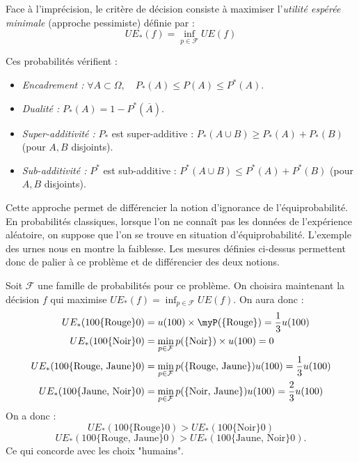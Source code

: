 Face à l'imprécision, le critère de décision consiste à maximiser l'\emph{utilité espérée minimale} (approche pessimiste) 
définie par : 
\begin{equation}
    UE_*(f) = \inf_{p \in \mathcal{F}} UE(f)
\end{equation}

\begin{prop}
    Ces probabilités vérifient :
    \begin{itemize}
        \item \emph{Encadrement :} $\forall A \subset \Omega, \quad P_*(A) \leqslant P(A) \leqslant P^*(A)$.
        \item \emph{Dualité :} $P_*(A) = 1 - P^*(\overline{A})$.
        \item \emph{Super-additivité :} $P_*$ est super-additive : $P_*(A \cup B) \geqslant P_*(A) + P_*(B)$ (pour $A, B$ disjoints).
        \item \emph{Sub-additivité :} $P^*$ est sub-additive : $P^*(A \cup B) \leqslant P^*(A) + P^*(B)$ (pour $A, B$ disjoints).
    \end{itemize}
\end{prop}

\begin{remark}
    Cette approche permet de différencier la notion d'ignorance de l'équiprobabilité. 
    En probabilités classiques, lorsque l'on ne connaît pas les données de l'expérience aléatoire, on suppose que 
    l'on se trouve en situation d'équiprobabilité. L'exemple des urnes nous en montre la faiblesse. 
    Les mesures définies ci-dessus permettent donc de palier à ce problème et de différencier des deux notions. 
\end{remark}

\begin{example}
    Soit $ \mathcal{F}$ une famille de probabilités pour ce problème. On choisira maintenant la décision 
    $f$ qui maximise $UE_*(f) = \inf_{p \in \mathcal{F}} UE(f)$. On aura donc : 
        \begin{align*}
            UE_*(100\{\text{Rouge}\}0) &= u(100) \times \myP(\{ \text{Rouge} \}) = \frac{1}{3} u(100) \\ 
            UE_*(100 \{ \text{Noir} \}0) &= \min_{p \in \mathcal{F}} p(\{ \text{Noir} \}) \times u(100) = 0 \\
            UE_*(100 \{ \text{Rouge, Jaune} \} 0) &= \min_{p \in \mathcal{F}} p(\{ \text{Rouge, Jaune} \}) u(100) = \frac{1}{3} u(100) \\ 
            UE_*(100 \{ \text{Jaune, Noir} \} 0) &=  \min_{p \in \mathcal{F}} p(\{ \text{Noir, Jaune} \}) u(100) = \frac{2}{3} u(100)
        \end{align*}
    On a donc : 
        $$ UE_*(100\{\text{Rouge}\}0) > UE_*(100 \{ \text{Noir} \}0) $$ 
        $$ UE_*(100 \{ \text{Rouge, Jaune} \} 0) > UE_*(100 \{ \text{Jaune, Noir} \} 0). $$ 
    Ce qui concorde avec les choix "humains". 
\end{example}

